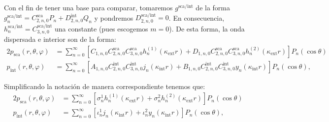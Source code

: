 \documentclass[11pt]{article}
\numberwithin{equation}{section}
\def\exterior{\textrm{ext}}
\def\interior{\textrm{int}}
\def\sca{\textrm{sca}}
\begin{document}
Con el fin de tener una base para comparar, tomaremos \(g^{\sca/\interior}\) de
la forma \(g^{\sca/\interior}_{n} = C^{\sca}_{2,n,0} P_{n} +
D^{\interior}_{2,n,0} Q_{n}\) y pondremos \(D^{\sca/\interior}_{2,n,0} = 0\). 
En consecuencia, \(h^{\sca/\interior}_{n} = C_{3,n,0}^{\sca/\interior}\) una
constante (pues escogemos \(m=0\)).
De esta forma, la onda dispersada e interior son de la forma:
\begin{alignat}{2}
	p_{\sca}(r,\theta,\varphi)
	&=
	\sum_{n=0}^{\infty}
	\left[
		C_{1,n,0} C^{\sca}_{2,n,0} C^{\sca}_{3,n,0} h^{(1)}_{n}(\kappa_{\exterior} r)
		+
		D_{1,n,0} C^{\sca}_{2,n,0} C^{\sca}_{3,n,0} h^{(2)}_{n}(\kappa_{\exterior} r)
	\right] P_{n}(\cos\theta)
	\\
	p_{\interior}(r,\theta,\varphi)
	&=
	\sum_{n=0}^{\infty}
	\left[
		A_{1,n,0} C^{\interior}_{2,n,0} C^{\interior}_{3,n,0} j_{n}(\kappa_{\interior} r)
		+
		B_{1,n,0} C^{\interior}_{2,n,0} C^{\interior}_{3,n,0} y_{n}(\kappa_{\interior} r)
	\right] P_{n}(\cos\theta),
\end{alignat}

Simplificando la notación de manera correspondiente tenemos que:
\begin{alignat}{2}
	p_{\sca}(r,\theta,\varphi)
	&=
	\sum_{n=0}^{\infty}
	\left[
		\sigma^{1}_{n} h^{(1)}_{n}(\kappa_{\exterior} r)
		+
		\sigma^{2}_{n} h^{(2)}_{n}(\kappa_{\exterior} r)
	\right] P_{n}(\cos\theta)
	\\
	p_{\interior}(r,\theta,\varphi)
	&=
	\sum_{n=0}^{\infty}
	\left[
		\iota^{1}_{n} j_{n}(\kappa_{\interior} r)
		+
		\iota^{2}_{n} y_{n}(\kappa_{\interior} r)
	\right] P_{n}(\cos\theta),
\end{alignat}
\end{document}
